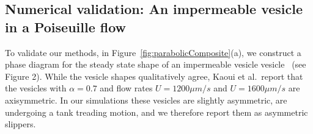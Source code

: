 \documentclass[9pt,twocolumn,twoside,lineno]{pnas-new}
\begin{document}
\subsection*{Numerical validation: An impermeable vesicle in a Poiseuille flow}
To validate our methods,
in Figure~\ref{fig:parabolicComposite}(a), we construct a phase diagram
for the steady state shape of an impermeable vesicle
vesicle~\cite{kao-bir-mis2009} (see Figure 2). While the vesicle shapes
qualitatively agree, Kaoui et al.~report that the vesicles with
$\alpha=0.7$ and flow rates $U = 1200 \mu m/s$ and $U = 1600 \mu m/s$ are
axisymmetric. In our simulations these vesicles are slightly asymmetric,
are undergoing a tank treading motion, and we therefore report them as
asymmetric slippers.
\end{document}
